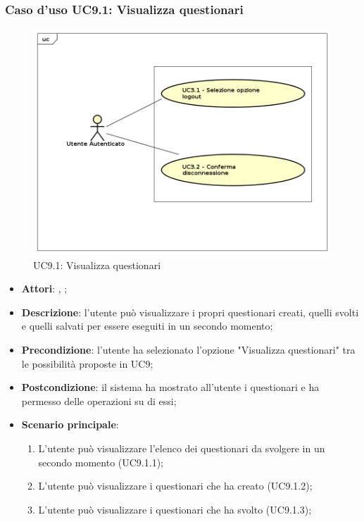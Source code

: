 	\subsubsection{Caso d'uso UC9.1: Visualizza questionari}
	\label{UC9.1}
	\begin{figure}[h]
		\centering
	\includegraphics[scale=0.5,keepaspectratio]{UML/UC9.png}
		\caption{UC9.1: Visualizza questionari}
	\end{figure}
	\FloatBarrier
	\begin{itemize}
		\item \textbf{Attori}: \uau, \uaupro;
		\item \textbf{Descrizione}: l'utente può visualizzare i propri questionari creati, quelli svolti e quelli salvati per essere eseguiti in un secondo momento; 
		\item \textbf{Precondizione}: l'utente ha selezionato l'opzione "Visualizza questionari" tra le possibilità proposte in UC9;
		\item \textbf{Postcondizione}: il sistema ha mostrato all'utente i questionari e ha permesso delle operazioni su di essi; 
		\item \textbf{Scenario principale}: 
			\begin{enumerate}
				\item L'utente può visualizzare l'elenco dei questionari da svolgere in un secondo momento (UC9.1.1);
				\item L'utente può visualizzare i questionari che ha creato (UC9.1.2); 
				\item L'utente può visualizzare i questionari che ha svolto (UC9.1.3); 
			\end{enumerate}
	\end{itemize}
	
